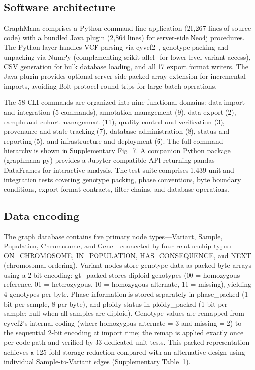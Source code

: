 \documentclass[pdflatex,sn-nature]{sn-jnl}
\begin{document}
\subsection*{Software architecture}

GraphMana comprises a Python command-line application (21,267 lines of source code) with a bundled Java plugin (2,864 lines) for server-side Neo4j procedures. The Python layer handles VCF parsing via cyvcf2~\cite{pedersen2017cyvcf2}, genotype packing and unpacking via NumPy (complementing scikit-allel~\cite{scikitallel} for lower-level variant access), CSV generation for bulk database loading, and all 17 export format writers. The Java plugin provides optional server-side packed array extension for incremental imports, avoiding Bolt protocol round-trips for large batch operations.

The 58 CLI commands are organized into nine functional domains: data import and integration (5 commands), annotation management (9), data export (2), sample and cohort management (11), quality control and verification (3), provenance and state tracking (7), database administration (8), status and reporting (5), and infrastructure and deployment (6). The full command hierarchy is shown in Supplementary Fig.~7. A companion Python package (graphmana-py) provides a Jupyter-compatible API returning pandas DataFrames for interactive analysis. The test suite comprises 1,439 unit and integration tests covering genotype packing, phase conventions, byte boundary conditions, export format contracts, filter chains, and database operations.

\subsection*{Data encoding}

The graph database contains five primary node types---Variant, Sample, Population, Chromosome, and Gene---connected by four relationship types: ON\_CHROMOSOME, IN\_POPULATION, HAS\_CONSEQUENCE, and NEXT (chromosomal ordering). Variant nodes store genotype data as packed byte arrays using a 2-bit encoding: gt\_packed stores diploid genotypes (00 = homozygous reference, 01 = heterozygous, 10 = homozygous alternate, 11 = missing), yielding 4 genotypes per byte. Phase information is stored separately in phase\_packed (1 bit per sample, 8 per byte), and ploidy status in ploidy\_packed (1 bit per sample; null when all samples are diploid). Genotype values are remapped from cyvcf2's internal coding (where homozygous alternate = 3 and missing = 2) to the sequential 2-bit encoding at import time; the remap is applied exactly once per code path and verified by 33 dedicated unit tests. This packed representation achieves a 125-fold storage reduction compared with an alternative design using individual Sample-to-Variant edges (Supplementary Table~1).
\end{document}
